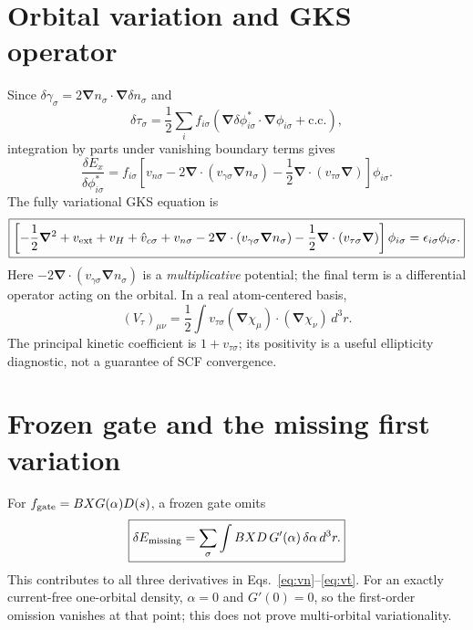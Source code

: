 \documentclass[11pt,a4paper]{article}
\newcommand{\dd}{\,d^3r}
\newcommand{\grad}{\boldsymbol\nabla}
\begin{document}
\section{Orbital variation and GKS operator}
Since $\delta\gamma_\sigma=2\grad n_\sigma\cdot\grad\delta n_\sigma$ and
\begin{equation}
\delta\tau_\sigma=\frac12\sum_i f_{i\sigma}\left(\grad\delta\phi_{i\sigma}^*\cdot\grad\phi_{i\sigma}+\mathrm{c.c.}\right),
\end{equation}
integration by parts under vanishing boundary terms gives
\begin{equation}
\frac{\delta E_x}{\delta\phi_{i\sigma}^*}=f_{i\sigma}\left[v_{n\sigma}-2\grad\cdot(v_{\gamma\sigma}\grad n_\sigma)-\frac12\grad\cdot(v_{\tau\sigma}\grad)\right]\phi_{i\sigma}.
\end{equation}
The fully variational GKS equation is
\begin{equation}
\boxed{\left[-\frac12\grad^2+v_{\rm ext}+v_H+\hat v_{c\sigma}+v_{n\sigma}-2\grad\cdot(v_{\gamma\sigma}\grad n_\sigma)-\frac12\grad\cdot(v_{\tau\sigma}\grad)\right]\phi_{i\sigma}=\epsilon_{i\sigma}\phi_{i\sigma}.}\label{eq:gks}
\end{equation}
Here $-2\grad\cdot(v_{\gamma\sigma}\grad n_\sigma)$ is a \emph{multiplicative} potential; the final term is a differential operator acting on the orbital. In a real atom-centered basis,
\begin{equation}(V_\tau)_{\mu\nu}=\frac12\int v_{\tau\sigma}(\grad\chi_\mu)\cdot(\grad\chi_\nu)\dd.\end{equation}
The principal kinetic coefficient is $1+v_{\tau\sigma}$; its positivity is a useful ellipticity diagnostic, not a guarantee of SCF convergence.

\section{Frozen gate and the missing first variation}
For $f_{\rm gate}=BXG(\alpha)D(s)$, a frozen gate omits
\begin{equation}\boxed{\delta E_{\rm missing}=\sum_\sigma\int BXD\,G'(\alpha)\,\delta\alpha\dd.}\end{equation}
This contributes to all three derivatives in Eqs.~\eqref{eq:vn}--\eqref{eq:vt}. For an exactly current-free one-orbital density, $\alpha=0$ and $G'(0)=0$, so the first-order omission vanishes at that point; this does not prove multi-orbital variationality.
\end{document}
